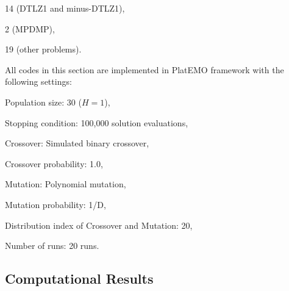 \documentclass[conference]{IEEEtran}
\begin{document}
14 (DTLZ1 and minus-DTLZ1),

2 (MPDMP),

19 (other problems).

All codes in this section are implemented in PlatEMO framework\cite{PlatEMO}
with the following settings: 

Population size: 30 ($H=1$), 

Stopping condition: 100,000 solution evaluations, 


Crossover: Simulated binary crossover, 

Crossover probability: 1.0,

Mutation: Polynomial mutation, 

Mutation probability: 1/D, 

Distribution index of Crossover and Mutation: 20, 

Number of runs: 20 runs.

% 
\subsection{Computational Results}
\end{document}
